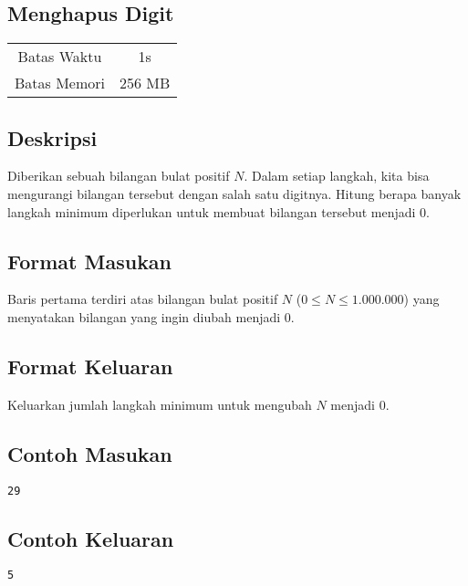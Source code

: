 \documentclass{article}
\begin{document}
\begin{center}

    
    \section*{Menghapus Digit} %

    \begin{tabular}{ | c c | }
        \hline
        Batas Waktu  & 1s \\    %
        Batas Memori & 256 MB \\  %
        \hline
    \end{tabular}
\end{center}

\subsection*{Deskripsi}

Diberikan sebuah bilangan bulat positif $N$. Dalam setiap langkah, kita bisa mengurangi bilangan tersebut dengan salah satu digitnya. Hitung berapa banyak langkah minimum diperlukan untuk membuat bilangan tersebut menjadi 0.
\subsection*{Format Masukan}

Baris pertama terdiri atas bilangan bulat positif $N$ ($0 \leq N \leq 1.000.000$) yang menyatakan bilangan yang ingin diubah menjadi 0.

\subsection*{Format Keluaran}

Keluarkan jumlah langkah minimum untuk mengubah $N$ menjadi 0.

\begin{multicols}{2}
\subsection*{Contoh Masukan}
\begin{lstlisting}
29
\end{lstlisting}
\columnbreak
\subsection*{Contoh Keluaran}
\begin{lstlisting}
5
\end{lstlisting}
\vfill
\null
\end{multicols}
\end{document}
